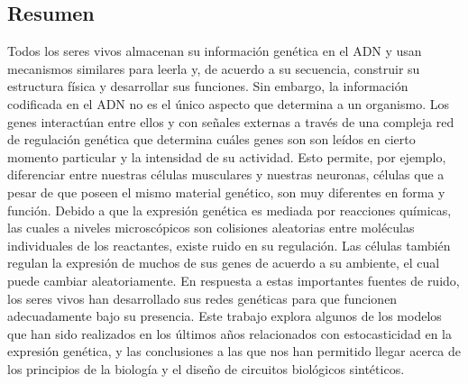 \documentclass[12pt,letterpaper,twoside,openright]{report}
\begin{document}
\subsection*{Resumen}
\vspace{-0.5cm}
\begin{singlespacing}
Todos los seres vivos almacenan su informaci\'on gen\'etica en el ADN y usan mecanismos similares para leerla y, de acuerdo a su secuencia, construir su estructura f\'isica y desarrollar sus funciones. Sin embargo, la informaci\'on codificada en el ADN no es el \'unico aspecto que determina a un organismo. Los genes interact\'uan entre ellos y con se\~nales externas a trav\'es de una compleja red de regulaci\'on gen\'etica que determina cu\'ales genes son son le\'idos en cierto momento particular y la intensidad de su actividad. Esto permite, por ejemplo, diferenciar entre nuestras c\'elulas musculares y nuestras neuronas, c\'elulas que a pesar de que poseen el mismo material gen\'etico, son muy diferentes en forma y funci\'on. Debido a que la expresi\'on gen\'etica es mediada por reacciones qu\'imicas, las cuales a niveles microsc\'opicos son colisiones aleatorias entre mol\'eculas individuales de los reactantes, existe ruido en su regulaci\'on. Las c\'elulas tambi\'en regulan la expresi\'on de muchos de sus genes de acuerdo a su ambiente, el cual puede cambiar aleatoriamente. En respuesta a estas importantes fuentes de ruido, los seres vivos han desarrollado sus redes gen\'eticas para que funcionen adecuadamente bajo su presencia. Este trabajo explora algunos de los modelos que han sido realizados en los \'ultimos a\~nos relacionados con estocasticidad en la expresi\'on gen\'etica, y las conclusiones a las que nos han permitido llegar acerca de los principios de la biolog\'ia y el dise\~no de circuitos biol\'ogicos sint\'eticos.\par
\end{singlespacing}
\newpage
\tableofcontents
\newpage
\listoffigures

\raggedbottom








\printbibliography
{}
\end{document}
